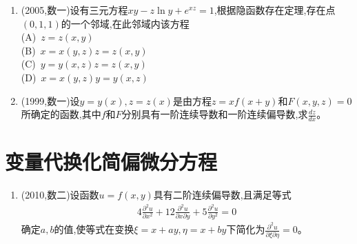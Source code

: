 \documentclass[12pt, a4paper, oneside, UTF8]{ctexbook}
\begin{document}
\begin{enumerate}[label=\arabic*.,start=6]
    \item (2005,数一)设有三元方程$xy-z\ln y+e^{xz}=1$,根据隐函数存在定理,存在点$(0,1,1)$的一个邻域,在此邻域内该方程 \\
    (A)\ $z=z(x,y)$ \\
    (B)\ $x=x(y,z)$$z=z(x,y)$ \\
    (C)\ $y=y(x,z)$$z=z(x,y)$ \\
    (D)\ $x=x(y,z)$$y=y(x,z)$

    \begin{solution}
    \newpage
    \end{solution}
    
    \item (1999,数一)设$y=y(x),z=z(x)$是由方程$z=xf(x+y)$和$F(x,y,z)=0$所确定的函数,其中$f$和$F$分别具有一阶连续导数和一阶连续偏导数,求$\frac{dz}{dx}$。
    
    \begin{solution}
    \newpage
    \end{solution}
\end{enumerate}

\section{变量代换化简偏微分方程}

\begin{enumerate}[label=\arabic*.,start=8]
    \item (2010,数二)设函数$u=f(x,y)$具有二阶连续偏导数,且满足等式
    \begin{align*}
        4\frac{\partial^2 u}{\partial x^2}+12\frac{\partial^2 u}{\partial x\partial y}+5\frac{\partial^2 u}{\partial y^2}=0
    \end{align*}
    确定$a,b$的值,使等式在变换$\xi=x+ay,\eta=x+by$下简化为$\frac{\partial^2 u}{\partial \xi\partial \eta}=0$。
    
    \begin{solution}
    \newpage
    \end{solution}
\end{enumerate}
\end{document}

